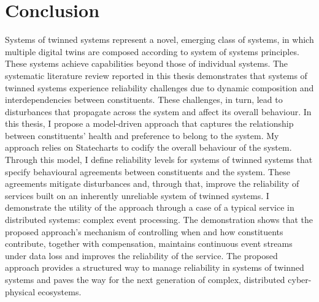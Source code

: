 \chapter{Conclusion}
\label{ch:conclusion}

Systems of twinned systems represent a novel, emerging class of systems, in which multiple digital twins are composed according to system of systems principles. These systems achieve capabilities beyond those of individual systems. The systematic literature review reported in this thesis demonstrates that systems of twinned systems experience reliability challenges due to dynamic composition and interdependencies between constituents. These challenges, in turn, lead to disturbances that propagate across the system and affect its overall behaviour. In this thesis, I propose a model-driven approach that captures the relationship between constituents' health and preference to belong to the system. My approach relies on Statecharts to codify the overall behaviour of the system. Through this model, I define reliability levels for systems of twinned systems that specify behavioural agreements between constituents and the system. These agreements mitigate disturbances and, through that, improve the reliability of services built on an inherently unreliable system of twinned systems. I demonstrate the utility of the approach through a case of a typical service in distributed systems: complex event processing. The demonstration shows that the proposed approach’s mechanism of controlling when and how constituents contribute, together with compensation, maintains continuous event streams under data loss and improves the reliability of the service. The proposed approach provides a structured way to manage reliability in systems of twinned systems and paves the way for the next generation of complex, distributed cyber-physical ecosystems.